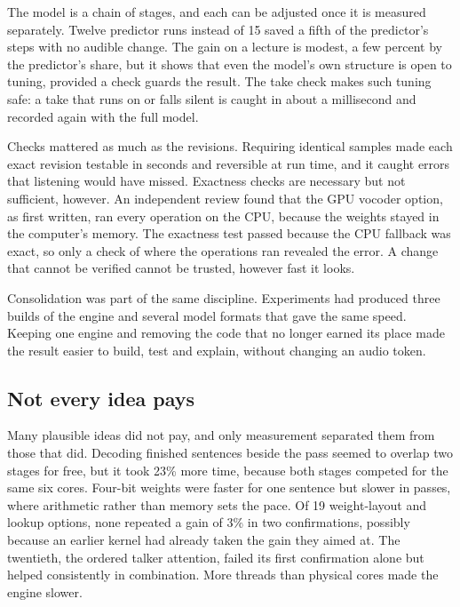 \documentclass[11pt]{article}
\begin{document}
The model is a chain of stages, and each can be adjusted once it is
measured separately. Twelve predictor runs instead of 15 saved a fifth
of the predictor's steps with no audible change. The gain on a lecture
is modest, a few percent by the predictor's share, but it shows that
even the model's own structure is open to tuning, provided a check
guards the result. The take check makes such tuning safe: a take that
runs on or falls silent is caught in about a millisecond and recorded
again with the full model.

Checks mattered as much as the revisions. Requiring identical samples
made each exact revision testable in seconds and reversible at run time,
and it caught errors that listening would have missed. Exactness checks
are necessary but not sufficient, however. An independent review found
that the GPU vocoder option, as first written, ran every operation on
the CPU, because the weights stayed in the computer's memory. The
exactness test passed because the CPU fallback was exact, so only a
check of where the operations ran revealed the error. A change that
cannot be verified cannot be trusted, however fast it looks.

Consolidation was part of the same discipline. Experiments had produced
three builds of the engine and several model formats that gave the same
speed. Keeping one engine and removing the code that no longer earned
its place made the result easier to build, test and explain, without
changing an audio token.

\hypertarget{not-every-idea-pays}{%
\subsection{Not every idea pays}\label{not-every-idea-pays}}

Many plausible ideas did not pay, and only measurement separated them
from those that did. Decoding finished sentences beside the pass seemed
to overlap two stages for free, but it took 23\% more time, because both
stages competed for the same six cores. Four-bit weights were faster for
one sentence but slower in passes, where arithmetic rather than memory
sets the pace. Of 19 weight-layout and lookup options, none repeated a
gain of 3\% in two confirmations, possibly because an earlier kernel had
already taken the gain they aimed at. The twentieth, the ordered talker
attention, failed its first confirmation alone but helped consistently
in combination. More threads than physical cores made the engine slower.
\end{document}
